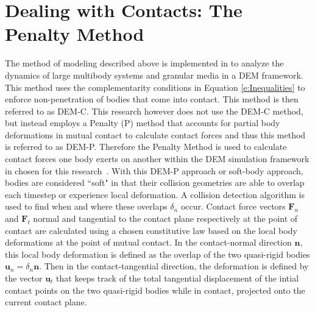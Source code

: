 \documentclass[12pt,onecolumn]{report}
\newcommand{\CHRONO}{{\sffamily{{Chrono}}}}
\begin{document}

\section{Dealing with Contacts: The Penalty Method}\label{s:Penalty}

The method of modeling described above is implemented in {\CHRONO} to analyze the dynamics of large multibody systems and granular media in a DEM framework. This method uses the complementarity conditions in Equation \ref{e:Inequalities} to enforce non-penetration of bodies that come into  contact. This method is then referred to as DEM-C. This research however does not use the DEM-C method, but instead employs a Penalty (P) method that accounts for partial body deformations in mutual contact to calculate contact forces and thus this method is referred to as DEM-P. Therefore the Penalty Method is used to calculate contact forces one body exerts on another within the DEM simulation framework in {\CHRONO} chosen for this research~\cite{Chrono2016}. With this DEM-P approach or soft-body approach, bodies are considered ``soft" in that their collision geometries are able to overlap each timestep or experience local deformation. A collision detection algorithm is used to find when and where these overlaps $\delta_n$ occur. Contact force vectors $\boldsymbol{F}_n$ and $\boldsymbol{F}_t$ normal and tangential to the contact plane respectively at the point of contact are calculated using a chosen constitutive law based on the local body deformations at the point of mutual contact. In the contact-normal direction $\boldsymbol{n}$, this local body deformation is defined as the overlap of the two quasi-rigid bodies $\boldsymbol{u}_n = \delta_n\boldsymbol{n}$. Then in the contact-tangential direction, the deformation is defined by the vector $\boldsymbol{u}_t$ that keeps track of the total tangential displacement of the intial contact points on the two quasi-rigid bodies while in contact, projected onto the current contact plane. 
\end{document}

